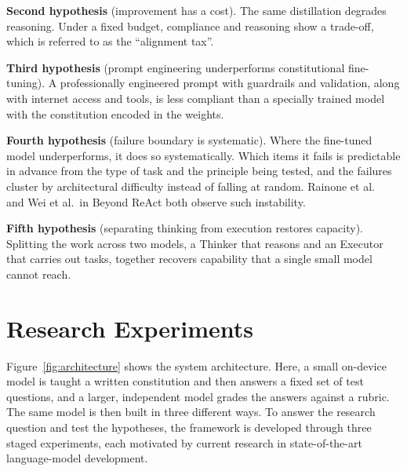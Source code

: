 \textbf{Second hypothesis} (improvement has a cost). The same distillation degrades reasoning. Under a fixed budget, compliance and reasoning show a trade-off, which is referred to as the ``alignment tax''.

\textbf{Third hypothesis} (prompt engineering underperforms constitutional fine-tuning). A professionally engineered prompt with guardrails and validation, along with internet access and tools, is less compliant than a specially trained model with the constitution encoded in the weights.

\textbf{Fourth hypothesis} (failure boundary is systematic). Where the fine-tuned model underperforms, it does so systematically. Which items it fails is predictable in advance from the type of task and the principle being tested, and the failures cluster by architectural difficulty instead of falling at random. Rainone et al.\ \cite{rainone2025replacingthinkingtoolusage} and Wei et al.\ in Beyond ReAct \cite{wei2025reactplannercentricframeworkcomplex} both observe such instability.

\textbf{Fifth hypothesis} (separating thinking from execution restores capacity). Splitting the work across two models, a Thinker that reasons and an Executor that carries out tasks, together recovers capability that a single small model cannot reach.

\section{Research Experiments}
\label{sec:research-experiments}

Figure~\ref{fig:architecture} shows the system architecture. Here, a small on-device model is taught a written constitution and then answers a fixed set of test questions, and a larger, independent model grades the answers against a rubric. The same model is then built in three different ways. To answer the research question and test the hypotheses, the framework is developed through three staged experiments, each motivated by current research in state-of-the-art language-model development.

